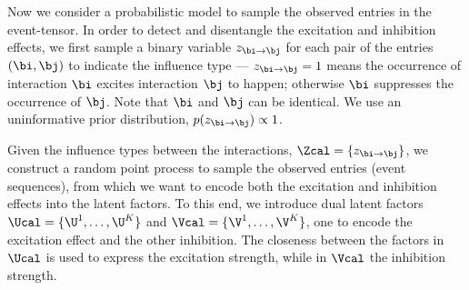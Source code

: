 Now  we consider a probabilistic model to sample the observed entries in the event-tensor. In order to detect and disentangle the excitation and inhibition effects, we first sample a binary variable $z_{\bi\rightarrow \bj}$ for each pair of the entries $(\bi,\bj)$ to indicate the influence type --- $z_{\bi\rightarrow \bj} = 1$ means the occurrence of interaction $\bi$ excites  interaction $\bj$ to happen; otherwise $\bi$ suppresses the occurrence of $\bj$. Note that $\bi$ and $\bj$ can be identical. We use an uninformative prior distribution, $p(z_{\bi\rightarrow\bj}) \propto 1$.%

Given the influence types between the interactions, $\Zcal = \{z_{\bi \rightarrow \bj}\}$, we construct a random point process to sample the observed entries (\ie event sequences), from which we want to encode both the excitation and inhibition effects into the latent factors. 
To this end, we introduce dual latent factors $\Ucal=\{\U^1,\ldots, \U^K\}$ and $\Vcal=\{\V^1, \ldots, \V^K\}$, one to encode the excitation effect and the other inhibition. The closeness between the factors in $\Ucal$  is used to express the excitation strength, while in  $\Vcal$ the inhibition strength.  
